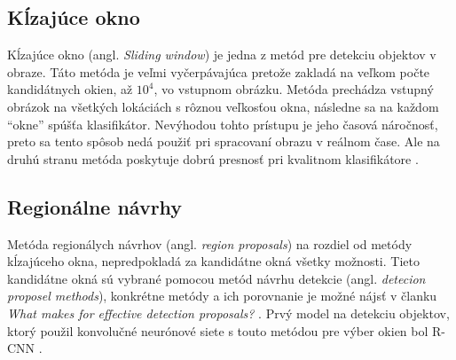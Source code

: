 \begin{comment}
    \subsubsection{Vyhľadávač na základe vizuálnej podobnosti obrázkov}
    Jednu z možných aplikácií detekcie objektov v obraze využíva Pinterest\footnote{\url{https://medium.com/@Pinterest_Engineering/introducing-automatic-object-detection-to-visual-search-e57c29191c30}}.
    Používaju detekciu objektov pre indexovanie rôznych častí obrázka.
    Týmto spôsobom si môže užívateľ pri hľadaní napr. špecifickej kabelky alebo topánok nájsť aj jej podobné.
    \begin{figure}[H]
        \centering
        \texttt{[image: purse]}
        \caption{Prototyp automatického označovania a vyhľadávania objektov \cite{odkaz:ObjectDetectionOverview}}
        \label{pic:kNN}
    \end{figure}
\end{comment}

\subsection{Kĺzajúce okno}
\label{subsec:slidingwindow}
Kĺzajúce okno (angl. \textit{Sliding window}) je jedna z metód pre detekciu objektov v obraze.
Táto metóda je veľmi vyčerpávajúca pretože zakladá na veľkom počte kandidátnych okien, až $10^4$, vo vstupnom obrázku.
Metóda prechádza vstupný obrázok na všetkých lokáciách s rôznou veľkosťou okna, následne sa na každom ``okne'' spúšťa klasifikátor.
Nevýhodou tohto prístupu je jeho časová náročnosť, preto sa tento spôsob nedá použiť pri spracovaní obrazu v reálnom čase.
Ale na druhú stranu metóda poskytuje dobrú presnosť pri kvalitnom klasifikátore \cite{prop:AutomaticHandgunDetection}.

\subsection{Regionálne návrhy}
\label{subsec:regionproposal}
Metóda regionálych návrhov (angl. \textit{region proposals}) na rozdiel od metódy kĺzajúceho okna, nepredpokladá za kandidátne okná všetky možnosti.
Tieto kandidátne okná sú vybrané pomocou metód návrhu detekcie (angl. \textit{detecion proposel methods}), konkrétne metódy
    a ich porovnanie je možné nájsť v članku \textit{What makes for effective detection proposals?} \cite{prop:ProposalMethods}.
Prvý model na detekciu objektov, ktorý použil konvolučné neurónové siete s touto metódou pre výber okien bol R-CNN \cite{prop:AutomaticHandgunDetection}.
